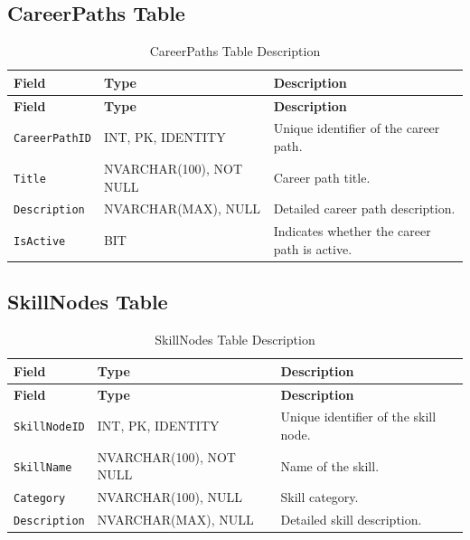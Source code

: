 \subsection{CareerPaths Table}

\begin{longtable}{|>{\raggedright\arraybackslash}m{2.9cm}|>{\raggedright\arraybackslash}m{3.45cm}|>{\raggedright\arraybackslash}m{4.95cm}|}
\caption{CareerPaths Table Description}
\label{tab:career_paths_table_description}
\\
\hline
\textbf{Field} & \textbf{Type} & \textbf{Description} \\
\hline
\endfirsthead
\hline
\textbf{Field} & \textbf{Type} & \textbf{Description} \\
\hline
\endhead
\texttt{CareerPathID} & INT, PK, IDENTITY & Unique identifier of the career path. \\
\hline
\texttt{Title} & NVARCHAR(100), NOT NULL & Career path title. \\
\hline
\texttt{Description} & NVARCHAR(MAX), NULL & Detailed career path description. \\
\hline
\texttt{IsActive} & BIT & Indicates whether the career path is active. \\
\hline
\end{longtable}

\subsection{SkillNodes Table}

\begin{longtable}{|>{\raggedright\arraybackslash}m{2.9cm}|>{\raggedright\arraybackslash}m{3.45cm}|>{\raggedright\arraybackslash}m{4.95cm}|}
\caption{SkillNodes Table Description}
\label{tab:skill_nodes_table_description}
\\
\hline
\textbf{Field} & \textbf{Type} & \textbf{Description} \\
\hline
\endfirsthead
\hline
\textbf{Field} & \textbf{Type} & \textbf{Description} \\
\hline
\endhead
\texttt{SkillNodeID} & INT, PK, IDENTITY & Unique identifier of the skill node. \\
\hline
\texttt{SkillName} & NVARCHAR(100), NOT NULL & Name of the skill. \\
\hline
\texttt{Category} & NVARCHAR(100), NULL & Skill category. \\
\hline
\texttt{Description} & NVARCHAR(MAX), NULL & Detailed skill description. \\
\hline
\end{longtable}

